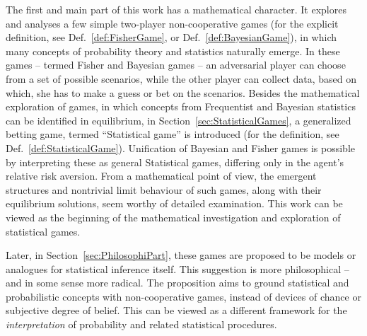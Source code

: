\documentclass{article}
\theoremstyle{definition}
\begin{document}
The first and main part of this work has a mathematical character.
It explores and analyses a few simple two-player non-cooperative games (for the explicit definition, see Def.~\ref{def:FisherGame}, or Def.~\ref{def:BayesianGame}), in which many concepts of probability theory and statistics naturally emerge.
In these games -- termed Fisher and Bayesian games -- an adversarial player can choose from a set of possible scenarios, while the other player can collect data, based on which, she has to make a guess or bet on the scenarios.
Besides the mathematical exploration of games, in which concepts from Frequentist and Bayesian statistics can be identified in equilibrium, in Section~\ref{sec:StatisticalGames}, a generalized betting game, termed ``Statistical game'' is introduced (for the definition, see Def.~\ref{def:StatisticalGame}).
Unification of Bayesian and Fisher games is possible by interpreting these as general Statistical games, differing only in the agent's relative risk aversion.
From a mathematical point of view, the emergent structures and nontrivial limit behaviour of such games, along with their equilibrium solutions, seem worthy of detailed examination.
This work can be viewed as the beginning of the mathematical investigation and exploration of statistical games.

Later, in Section~\ref{sec:PhilosophiPart}, these games are proposed to be models or analogues for statistical inference itself.
This suggestion is more philosophical -- and in some sense more radical. The proposition aims to ground statistical and probabilistic concepts with non-cooperative games, instead of devices of chance or subjective degree of belief.
This can be viewed as a different framework for the \emph{interpretation} of probability and related statistical procedures. 
\end{document}
